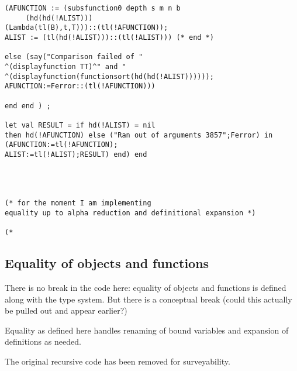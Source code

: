 \documentclass[12pt]{article}
\begin{document}
\begin{verbatim}
(AFUNCTION := (subsfunction0 depth s m n b 
     (hd(hd(!ALIST))) 
(Lambda(tl(B),t,T)))::(tl(!AFUNCTION));
ALIST := (tl(hd(!ALIST)))::(tl(!ALIST))) (* end *)

else (say("Comparison failed of "
^(displayfunction TT)^" and "
^(displayfunction(functionsort(hd(hd(!ALIST))))));
AFUNCTION:=Ferror::(tl(!AFUNCTION)))

end end ) ;

let val RESULT = if hd(!ALIST) = nil 
then hd(!AFUNCTION) else ("Ran out of arguments 3857";Ferror) in
(AFUNCTION:=tl(!AFUNCTION);
ALIST:=tl(!ALIST);RESULT) end) end




(* for the moment I am implementing
equality up to alpha reduction and definitional expansion *)

(*

\end{verbatim}

\newpage

\subsection{Equality of objects and functions}

There is no break in the code here:  equality of objects and functions is defined along with the type system.
But there is a conceptual break (could this actually be pulled out and appear earlier?)

Equality as defined here handles renaming of bound variables and expansion of definitions as needed.

The original recursive code has been removed for surveyability.
\end{document}
